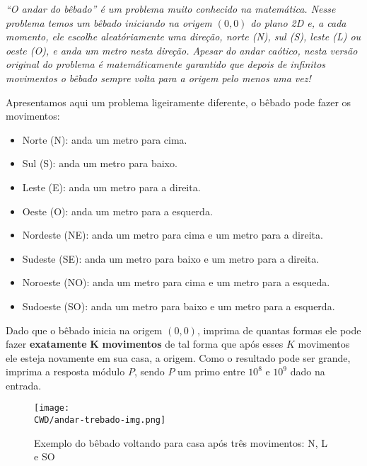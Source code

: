 %
\begin{center}
\textit{“O andar do bêbado” é um problema muito conhecido na matemática. Nesse problema temos um bêbado iniciando na origem $(0, 0)$ do plano 2D e, a cada momento, ele escolhe aleatóriamente uma direção, norte (N), sul (S), leste (L) ou oeste (O), e anda um metro nesta direção. Apesar do andar caótico, nesta versão original do problema é matemáticamente garantido que depois de infinitos movimentos o bêbado sempre volta para a origem pelo menos uma vez!}
\end{center}

Apresentamos aqui um problema ligeiramente diferente, o bêbado pode fazer os movimentos:
\begin{itemize}
    \item Norte (N): anda um metro para cima.
    \item Sul (S): anda um metro para baixo.
    \item Leste (E): anda um metro para a direita.
    \item Oeste (O): anda um metro para a esquerda.
    \item Nordeste (NE): anda um metro para cima e um metro para a direita.
    \item Sudeste (SE): anda um metro para baixo e um metro para a direita.
    \item Noroeste (NO): anda um metro para cima e um metro para a esqueda.
    \item Sudoeste (SO): anda um metro para baixo e um metro para a esquerda.
\end{itemize}

Dado que o bêbado inicia na origem $(0, 0)$, imprima de quantas formas ele pode fazer \textbf{exatamente} $\boldsymbol K$ \textbf{movimentos} de tal forma que após esses $K$ movimentos ele esteja novamente em sua casa, a origem. Como o resultado pode ser grande, imprima a resposta módulo $P$, sendo $P$ um primo entre $10^8$ e $10^9$ dado na entrada.

\begin{figure}[H]
    \centering
    \texttt{[image: \\CWD/andar-trebado-img.png]}
    \caption{Exemplo do bêbado voltando para casa após três movimentos: N, L e SO}
\end{figure}

